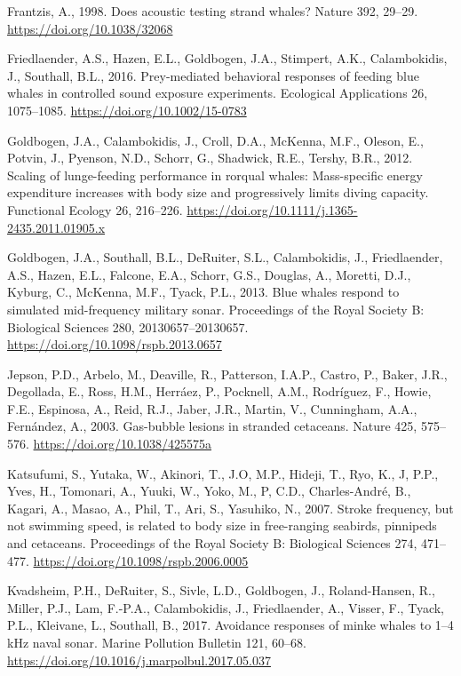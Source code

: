 \documentclass[]{elsarticle} %
\begin{document}
\hypertarget{ref-frantzis_does_1998}{}
Frantzis, A., 1998. Does acoustic testing strand whales? Nature 392,
29--29. \url{https://doi.org/10.1038/32068}

\hypertarget{ref-friedlaender_prey-mediated_2016}{}
Friedlaender, A.S., Hazen, E.L., Goldbogen, J.A., Stimpert, A.K.,
Calambokidis, J., Southall, B.L., 2016. Prey-mediated behavioral
responses of feeding blue whales in controlled sound exposure
experiments. Ecological Applications 26, 1075--1085.
\url{https://doi.org/10.1002/15-0783}

\hypertarget{ref-goldbogen_scaling_2012}{}
Goldbogen, J.A., Calambokidis, J., Croll, D.A., McKenna, M.F., Oleson,
E., Potvin, J., Pyenson, N.D., Schorr, G., Shadwick, R.E., Tershy, B.R.,
2012. Scaling of lunge-feeding performance in rorqual whales:
Mass-specific energy expenditure increases with body size and
progressively limits diving capacity. Functional Ecology 26, 216--226.
\url{https://doi.org/10.1111/j.1365-2435.2011.01905.x}

\hypertarget{ref-goldbogen_blue_2013}{}
Goldbogen, J.A., Southall, B.L., DeRuiter, S.L., Calambokidis, J.,
Friedlaender, A.S., Hazen, E.L., Falcone, E.A., Schorr, G.S., Douglas,
A., Moretti, D.J., Kyburg, C., McKenna, M.F., Tyack, P.L., 2013. Blue
whales respond to simulated mid-frequency military sonar. Proceedings of
the Royal Society B: Biological Sciences 280, 20130657--20130657.
\url{https://doi.org/10.1098/rspb.2013.0657}

\hypertarget{ref-jepson_gas-bubble_2003}{}
Jepson, P.D., Arbelo, M., Deaville, R., Patterson, I.A.P., Castro, P.,
Baker, J.R., Degollada, E., Ross, H.M., Herráez, P., Pocknell, A.M.,
Rodríguez, F., Howie, F.E., Espinosa, A., Reid, R.J., Jaber, J.R.,
Martin, V., Cunningham, A.A., Fernández, A., 2003. Gas-bubble lesions in
stranded cetaceans. Nature 425, 575--576.
\url{https://doi.org/10.1038/425575a}

\hypertarget{ref-katsufumi_stroke_2007}{}
Katsufumi, S., Yutaka, W., Akinori, T., J.O, M.P., Hideji, T., Ryo, K.,
J, P.P., Yves, H., Tomonari, A., Yuuki, W., Yoko, M., P, C.D.,
Charles-André, B., Kagari, A., Masao, A., Phil, T., Ari, S., Yasuhiko,
N., 2007. Stroke frequency, but not swimming speed, is related to body
size in free-ranging seabirds, pinnipeds and cetaceans. Proceedings of
the Royal Society B: Biological Sciences 274, 471--477.
\url{https://doi.org/10.1098/rspb.2006.0005}

\hypertarget{ref-kvadsheim_avoidance_2017}{}
Kvadsheim, P.H., DeRuiter, S., Sivle, L.D., Goldbogen, J.,
Roland-Hansen, R., Miller, P.J., Lam, F.-P.A., Calambokidis, J.,
Friedlaender, A., Visser, F., Tyack, P.L., Kleivane, L., Southall, B.,
2017. Avoidance responses of minke whales to 1--4 kHz naval sonar.
Marine Pollution Bulletin 121, 60--68.
\url{https://doi.org/10.1016/j.marpolbul.2017.05.037}
\end{document}
